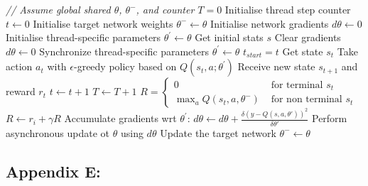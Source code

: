 \documentclass{article}
\begin{document}
\begin{algorithmic}[1]
\State \textit{// Assume global shared  $\theta$, $\theta^{-}$, and counter $T = 0$}
\State Initialise thread step counter $t \gets 0$
\State Initialise target network weights $\theta^{-} \gets \theta$
\State Initialise network gradients $d\theta \gets 0$
\State Initialise thread-specific parameters $\theta^\prime \gets \theta$
\State Get initial stats $s$
    \State Clear gradients $d\theta \gets 0$
    \State Synchronize thread-specific parameters $\theta^\prime \gets \theta$
    \State $t_{start} = t$
    \State Get state $s_t$
        \State Take action $a_t$ with $\epsilon$-greedy policy based on $Q\left(s_t,a;\theta^\prime\right)$
        \State Receive new state $s_{t+1}$ and reward $r_t$
        \State $t \gets t + 1$
        \State $T \gets T + 1$
    \EndWhile
    \State $R= \begin{cases}0 & \text { for terminal } s_t \\ \max _{a} Q\left(s_t, a, \theta^{-}\right) & \text { for non terminal } s_t\end{cases}$
        \State $R \gets r_i + \gamma R$
        \State Accumulate gradients wrt $\theta^\prime$: $d\theta \gets d\theta + \frac{\delta\left( y-Q\left(s, a, \theta\prime\right)\right)^{2}}{\delta\theta\prime}$
    \EndFor
    \State Perform asynchronous update ot $\theta$ using $d\theta$
        \State Update the target network $\theta^{-} \gets \theta$
    \EndIf
\EndWhile

\end{algorithmic}


\subsection*{Appendix E: }
\end{document}
